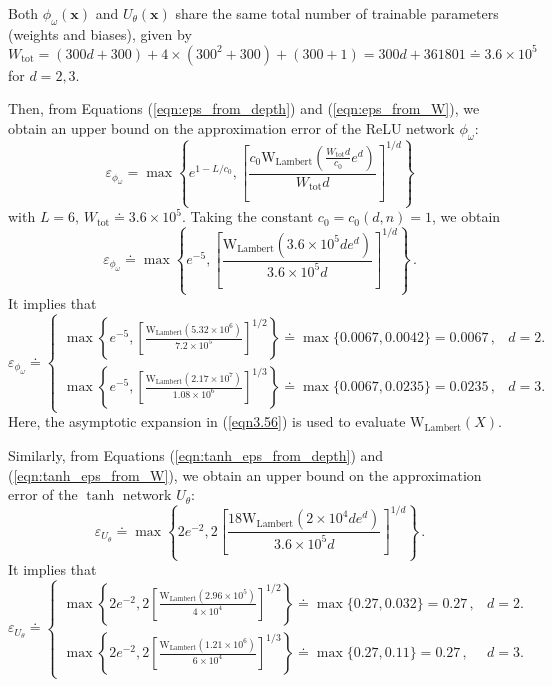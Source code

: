 \documentclass[final,hidelinks,onefignum,onetabnum]{siamart251216}
\begin{document}
Both $\phi_\omega(\mathbf{x})$ and $U_\theta(\mathbf{x})$ share the same total number of trainable parameters (weights and biases), given by
\[
W_{\mathrm{tot}} = (300d+300) + 4 \times( 300^2 + 300) + (300 + 1) = 300d + 361801 \doteq 3.6 \times 10^5
\]
for $d=2,3$.

Then, from Equations (\ref{eqn:eps_from_depth}) and (\ref{eqn:eps_from_W}), we obtain an upper bound on the approximation error of the ReLU network $\phi_\omega$:
\[
\varepsilon_{\phi_\omega}=\max\left\{e^{1 - L/c_{0}}, \left[ \frac{c_{0} \mathrm{W_{Lambert}}\left( \frac{W_{\mathrm{tot}} d}{c_{0}} e^{d} \right)}{W_{\mathrm{tot}} d} \right]^{1/d}\right\}
\]
with $L=6,\,W_{\mathrm{tot}}\doteq3.6 \times 10^5$. Taking the constant $c_0=c_0(d,n)=1$, we obtain
\[
\varepsilon_{\phi_\omega}\doteq \max\left\{e^{-5}, \left[\frac{\mathrm{W_{Lambert}}\left(3.6 \times 10^5 d e^{d} \right)}{3.6 \times 10^5 d} \right]^{1/d}\right\}\,.
\]
It implies that
\begin{equation*}
\varepsilon_{\phi_\omega}\doteq \left\{
\begin{array}{lr}
\max\left\{e^{-5}, \left[\frac{\mathrm{W_{Lambert}}\left(5.32 \times 10^6 \right)}{7.2 \times 10^5} \right]^{1/2}\right\}\doteq\max\{0.0067,0.0042\}=0.0067\,,&d=2. \\
\max\left\{e^{-5}, \left[\frac{\mathrm{W_{Lambert}}\left(2.17 \times 10^7 \right)}{1.08 \times 10^6} \right]^{1/3}\right\}\doteq\max\{0.0067,0.0235\}=0.0235\,,&d=3.
\end{array}
\right.
\end{equation*}
Here, the asymptotic expansion in (\ref{eqn3.56}) is used to evaluate $\mathrm{W_{Lambert}}(X)$.

Similarly, from Equations (\ref{eqn:tanh_eps_from_depth}) and (\ref{eqn:tanh_eps_from_W}), we obtain an upper bound on the approximation error of the $\tanh$ network $U_\theta$:
\[
\varepsilon_{U_\theta}\doteq \max\left\{2e^{-2}, 2\left[\frac{18\mathrm{W_{Lambert}}\left(2 \times 10^4 d e^{d} \right)}{3.6 \times 10^5 d} \right]^{1/d}\right\}\,.
\]
It implies that
\begin{equation*}
\varepsilon_{U_\theta}\doteq \left\{
\begin{array}{lr}
\max\left\{2e^{-2}, 2\left[\frac{\mathrm{W_{Lambert}}\left(2.96 \times 10^5\right)}{4 \times 10^4} \right]^{1/2}\right\}\doteq\max\{0.27,0.032\}=0.27\,,&d=2. \\
\max\left\{2e^{-2}, 2\left[\frac{\mathrm{W_{Lambert}}\left(1.21\times 10^6 \right)}{6 \times 10^4} \right]^{1/3}\right\}\doteq\max\{0.27,0.11\}=0.27\,,&d=3.
\end{array}
\right.
\end{equation*}
\end{document}
